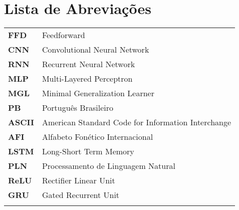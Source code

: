 \chapter{Lista de Abreviações}
\begin{tabular}{ll}
\vspace{3mm}
\textbf{FFD} 		 & Feedforward\\ 
\vspace{3mm}

\textbf{CNN} 		 & Convolutional Neural Network\\ 

\textbf{RNN} 		 & Recurrent Neural Network\\ \vspace{3mm}

\textbf{MLP} 		 & Multi-Layered Perceptron\\ \vspace{3mm}

\textbf{MGL} 		 & Minimal Generalization Learner\\ \vspace{3mm}

\textbf{PB} 		 & Português Brasileiro\\ \vspace{3mm}

\textbf{ASCII} 		 & American Standard Code for Information Interchange\\ 
\vspace{3mm}


\textbf{AFI} 		 & Alfabeto Fonético Internacional\\ \vspace{3mm}
\textbf{LSTM} 		 & Long-Short Term Memory\\ \vspace{3mm}
\textbf{PLN} 		 & Processamento de Linguagem Natural\\ 
\vspace{3mm}
\textbf{ReLU} 		 & Rectifier Linear Unit\\ \vspace{3mm}
\textbf{GRU} 		 & Gated Recurrent Unit\\ 
\vspace{3mm}



\end{tabular}
